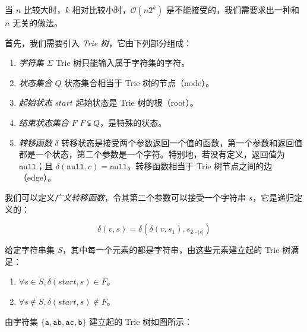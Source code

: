 \documentclass{article}
\begin{document}
当 $n$ 比较大时，$k$ 相对比较小时，$\mathcal O(n2^k)$ 是不能接受的，我们需要求出一种和 $n$ 无关的做法。

首先，我们需要引入 \textsl{Trie 树}，它由下列部分组成：

\begin{enumerate}
    \item \textsl{字符集} $\Sigma$ \qquad Trie 树只能输入属于字符集的字符。
    \item \textsl{状态集合} $Q$ \qquad 状态集合相当于 Trie 树的节点（node）。
    \item \textsl{起始状态} $start$ \qquad 起始状态是 Trie 树的根（root）。
    \item \textsl{结束状态集合} $F$ \qquad $F \subsetneqq Q$，是特殊的状态。
    \item \textsl{转移函数} $\delta$ \qquad 转移状态是接受两个参数返回一个值的函数，第一个参数和返回值都是一个状态，第二个参数是一个字符。特别地，若没有定义，返回值为 $\texttt{null}$；且 $\delta(\texttt{null},c)=\texttt{null}$。转移函数相当于 Trie 树节点之间的边（edge）。
\end{enumerate}

我们可以定义\textsl{广义转移函数}，令其第二个参数可以接受一个字符串 $s$，它是递归定义的：

$$\delta(v,s)=\delta(\delta(v,s_1),s_{2 \cdots |s|})$$

给定字符串集 $S$，其中每一个元素的都是字符串，由这些元素建立起的 Trie 树满足：

\begin{enumerate}
    \item $\forall s \in S, \delta(start,s) \in F$。
    \item $\forall s \notin S, \delta(start,s) \notin F$。
\end{enumerate}

由字符集 $\{\texttt{a},\texttt{ab},\texttt{ac},\texttt{b}\}$ 建立起的 Trie 树如图所示：

\begin{center}
\end{center}
\end{document}
